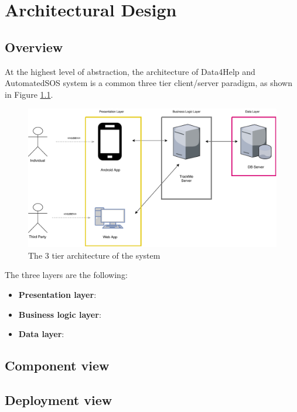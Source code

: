 \chapter{Architectural Design}

\section{Overview}

At the highest level of abstraction, the architecture of Data4Help and AutomatedSOS system is a common three tier client/server paradigm, as shown in Figure \ref{f:3tier}.





\begin{figure}[H]
\centering
\includegraphics[scale=0.65]{resources/overview}
\caption{The 3 tier architecture of the system}\label{f:3tier}
\end{figure}
\noindent
The three layers are the following:

\begin{itemize}
\item \textbf{Presentation layer}:
\item \textbf{Business logic layer}:
\item \textbf{Data layer}:
\end{itemize}




\section{Component view}
\section{Deployment view}


















